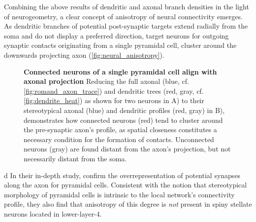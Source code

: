 Combining the above results of dendritic and axonal branch densities
in the light of neurogeometry, a clear concept of anisotropy of neural
connectivity emerges. As dendritic branches of potential post-synaptic
targets extend radially from the soma and do not display a preferred
direction, target neurons for outgoing synaptic contacts originating
from a single pyramidal cell, cluster around the downwards projecting
axon (\autoref{fig:neural_anisotropy}). %
\begin{figure}[!ht]
  \centering 

    \caption{%
      \textbf{Connected neurons of a single pyramidal cell align with
        axonal projection} Reducing the full axonal (blue,
      cf. \autoref{fig:romand_axon_trace}) and dendritic trees (red, gray,
      cf. \autoref{fig:dendrite_heat}) as shown for two neurons in A)
      to their stereotypical axonal (blue) and dendritic profiles
      (red, gray) in B), demonstrates how connected neurons (red) tend
      to cluster around the pre-synaptic axon's profile, as spatial
      closeness constitutes a necessary condition for the formation of
      contacts. Unconnected neurons (gray) are found distant from the
      axon's projection, but not necessarily distant from the soma. }
  \label{fig:neural_anisotropy}
\end{figure}
d%
In their in-depth study, \textcite{Stepanyants2005} confirm the
overrepresentation of potential synapses along the axon for pyramidal
cells. Consistent with the notion that stereotypical morphology of
pyramidal cells is intrinsic to the local network's connectivity
profile, they also find that anisotropy of this degree is \textit{not}
present in spiny stellate neurons located in lower-layer-4.


